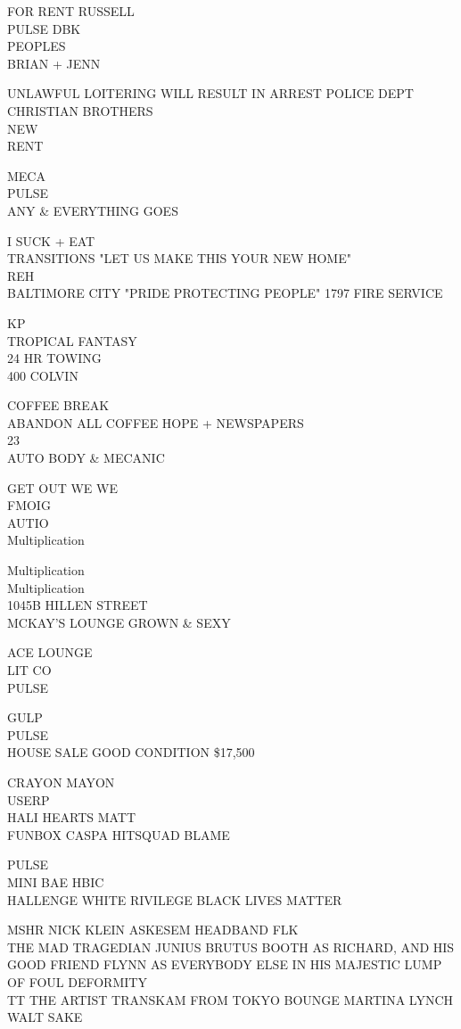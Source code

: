 \documentclass[10pt,letterpaper]{article}
\begin{document}
FOR RENT RUSSELL\\
PULSE DBK\\
PEOPLES\\
BRIAN + JENN

UNLAWFUL LOITERING WILL RESULT IN ARREST POLICE DEPT\\
CHRISTIAN BROTHERS\\
NEW\\
RENT

MECA\\
PULSE\\
ANY \& EVERYTHING GOES

I SUCK + EAT\\
TRANSITIONS "LET US MAKE THIS YOUR NEW HOME"\\
REH\\
BALTIMORE CITY "PRIDE PROTECTING PEOPLE" 1797 FIRE SERVICE

KP\\
TROPICAL FANTASY\\
24 HR TOWING\\
400 COLVIN

COFFEE BREAK\\
ABANDON ALL COFFEE HOPE + NEWSPAPERS\\
23\\
AUTO BODY \& MECANIC

GET OUT WE WE\\
FMOIG\\
AUTIO\\
Multiplication

Multiplication\\
Multiplication\\
1045B HILLEN STREET\\
MCKAY'S LOUNGE GROWN \& SEXY

ACE LOUNGE\\
LIT CO\\
PULSE

GULP\\
PULSE\\
HOUSE SALE GOOD CONDITION \$17,500

CRAYON MAYON\\
USERP\\
HALI HEARTS MATT\\
FUNBOX CASPA HITSQUAD BLAME

PULSE\\
MINI BAE HBIC\\
HALLENGE WHITE RIVILEGE BLACK LIVES MATTER

MSHR NICK KLEIN ASKESEM HEADBAND FLK\\
THE MAD TRAGEDIAN JUNIUS BRUTUS BOOTH AS RICHARD, AND HIS GOOD FRIEND FLYNN AS EVERYBODY ELSE IN HIS MAJESTIC LUMP OF FOUL DEFORMITY\\
TT THE ARTIST TRANSKAM FROM TOKYO BOUNGE MARTINA LYNCH\\
WALT SAKE
\end{document}

